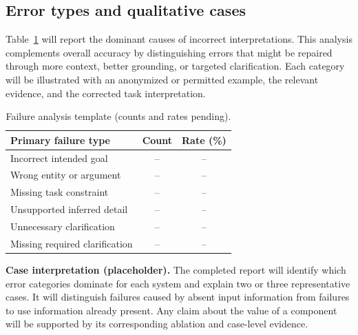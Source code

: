 \documentclass[10pt,conference]{IEEEtran}
\renewcommand{\arraystretch}{1.10}
\begin{document}
\FloatBarrier
\subsection{Error types and qualitative cases}
Table~\ref{tab:failure} will report the dominant causes of incorrect interpretations. This analysis complements overall accuracy by distinguishing errors that might be repaired through more context, better grounding, or targeted clarification. Each category will be illustrated with an anonymized or permitted example, the relevant evidence, and the corrected task interpretation.
\begin{table}[!tbp]
\caption{Failure analysis template (counts and rates pending).}
\label{tab:failure}
\centering\footnotesize
\renewcommand{\arraystretch}{1.32}
\begin{tabularx}{\columnwidth}{@{}Xcc@{}}
\toprule
\textbf{Primary failure type} & \textbf{Count} & \textbf{Rate (\%)}\\
\midrule
Incorrect intended goal & -- & --\\
Wrong entity or argument & -- & --\\
Missing task constraint & -- & --\\
Unsupported inferred detail & -- & --\\
Unnecessary clarification & -- & --\\
Missing required clarification & -- & --\\
\bottomrule
\end{tabularx}
\end{table}
\noindent\textbf{Case interpretation (placeholder).} The completed report will identify which error categories dominate for each system and explain two or three representative cases. It will distinguish failures caused by absent input information from failures to use information already present. Any claim about the value of a component will be supported by its corresponding ablation and case-level evidence.

\FloatBarrier
\end{document}
